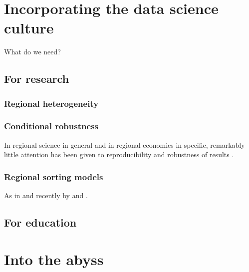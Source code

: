 \documentclass[fleqn,10pt]{SelfArx} %
\begin{document}
\section{Incorporating the data science culture\label{agenda}}

What do we need?

\subsection{For research}

\subsubsection{Regional heterogeneity}

\citep{Thissen2016, Graaff2012, DeGraaff2012}

\subsubsection{Conditional robustness}

In regional science in general and in regional economics in specific, remarkably little attention has been given to reproducibility and robustness of results \citep[with some exceptions as, amongst some others, by][]{Rey:2014cl,arribas2015woow, Arribas2016}.

\subsubsection{Regional sorting models}

As in \citet{Bayer2004, Bayer2007a} and recently by \citet{Wang2016} and \citet{Bernasco2016}.

\subsection{For education}

\citet{schwabish2014economist}

\section{Into the abyss}


\printbibliography

\end{document}
